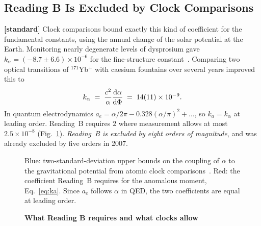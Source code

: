 \documentclass[%
 reprint, amsmath,amssymb, aps, prb, ]{revtex4-2}
\numberwithin{equation}{section}
\begin{document}
\subsection{Reading B Is Excluded by Clock Comparisons}
\label{subsec:LPI}

\textbf{[standard]} Clock comparisons bound exactly this kind of coefficient for the fundamental constants, using the annual change of the solar potential at the Earth. Monitoring nearly degenerate levels of dysprosium gave $k_\alpha = (-8.7\pm6.6)\times10^{-6}$ for the fine-structure constant~\cite{ferrell2007}. Comparing two optical transitions of $^{171}$Yb$^{+}$ with caesium fountains over several years improved this to~\cite{lange2021}
\begin{equation}
k_\alpha \;=\; \frac{c^{2}}{\alpha}\dv{\alpha}{\Phi} \;=\; 14(11)\times10^{-9} .
\label{eq:kalpha}
\end{equation}
In quantum electrodynamics $a_e = \alpha/2\pi - 0.328(\alpha/\pi)^{2} + \dots$, so $k_a = k_\alpha$ at leading order. Reading~B requires $2$ where measurement allows at most $2.5\times10^{-8}$ (Fig.~\ref{fig:lpi}). \emph{Reading~B is excluded by eight orders of magnitude}, and was already excluded by five orders in 2007.

\begin{figure}[t!]
\centering
{}
\caption{\textbf{What Reading B requires and what clocks allow}}
\label{fig:lpi}
\vspace{0.4em}
\begin{minipage}{0.95\columnwidth}
\justifying\small
Blue: two-standard-deviation upper bounds on the coupling of $\alpha$ to the gravitational potential from atomic clock comparisons~\cite{ferrell2007,lange2021}. Red: the coefficient Reading~B requires for the anomalous moment, Eq.~\eqref{eq:ka}. Since $a_e$ follows $\alpha$ in QED, the two coefficients are equal at leading order.
\end{minipage}
\end{figure}
\end{document}
